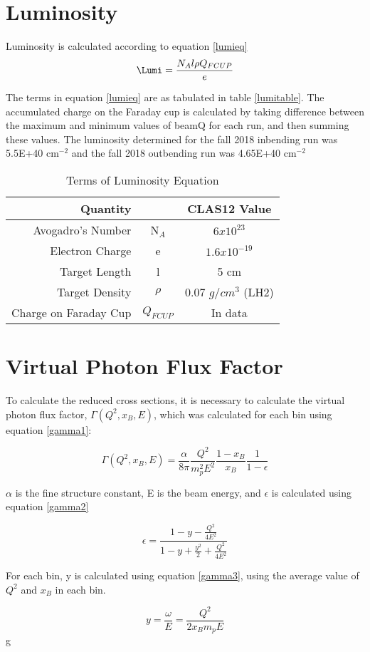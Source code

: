 \section{Luminosity}

Luminosity is calculated according to equation \ref{lumieq}
 \begin{equation}\label{lumieq}
            \Lumi = \frac{N_A l \rho Q_{FCUP}}{e}
\end{equation}

The terms in equation \ref{lumieq} are as tabulated in table \ref{lumitable}. The accumulated charge on the Faraday cup is calculated by taking difference between the maximum and minimum values of beamQ for each run, and then summing these values. The luminosity determined for the fall 2018 inbending run was 5.5E+40 cm$^{-2}$ and the fall 2018 outbending run was 4.65E+40 cm$^{-2}$

\begin{table}[h]
    \centering
    \begin{tabular}{rcc}
        Quantity &  & CLAS12 Value \\\hline
       Avogadro's Number &  N$_A$  & $6x10^{23}$ \\
        Electron Charge &e  &  $1.6x10^{-19}$ \\
        Target Length &l &  5 cm \\
        Target Density &$\rho$  &  0.07 $g/cm^3$ (LH2) \\
        Charge on Faraday Cup & $Q_{FCUP}$ &  In data\\
    \end{tabular}
\caption{Terms of Luminosity Equation}
\end{table}\label{lumitable}

\section{Virtual Photon Flux Factor}
To calculate the reduced cross sections, it is necessary to calculate the virtual photon flux factor, $\Gamma (Q^2, x_B, E)$, which was calculated for each bin using equation \ref{gamma1}:

 \begin{equation}\label{gamma1}
            \Gamma (Q^2, x_B, E) = \frac{\alpha}{8\pi} \frac{Q^2}{m^2_pE^2}\frac{1-x_B}{x_B}\frac{1}{1-\epsilon}
\end{equation}

$\alpha$ is the fine structure constant, E is the beam energy, and $\epsilon$ is calculated using equation \ref{gamma2}

 \begin{equation}\label{gamma2}
            \epsilon = \frac{1-y-\frac{Q^2}{4E^2}}{1-y+\frac{y^2}{2}+\frac{Q^2}{4E^2}}
\end{equation}

For each bin, y is calculated using equation \ref{gamma3}, using the average value of $Q^2$ and $x_B$ in each bin.

 \begin{equation}\label{gamma3}
           y = \frac{\omega}{E} = \frac{Q^2}{2x_Bm_pE}
\end{equation}g